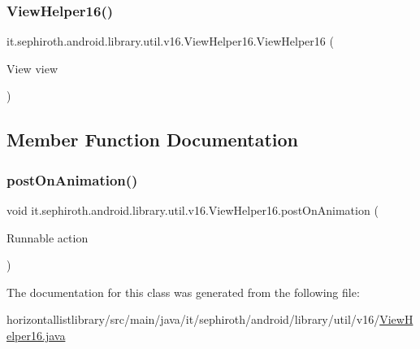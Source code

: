 \subsubsection{\texorpdfstring{View\+Helper16()}{ViewHelper16()}}
{\footnotesize\ttfamily it.\+sephiroth.\+android.\+library.\+util.\+v16.\+View\+Helper16.\+View\+Helper16 (\begin{DoxyParamCaption}\item[{View}]{view }\end{DoxyParamCaption})}



\subsection{Member Function Documentation}
\mbox{\label{classit_1_1sephiroth_1_1android_1_1library_1_1util_1_1v16_1_1_view_helper16_a557cbede1bd2fcb39f1fe329d4b3b243}} 
\subsubsection{\texorpdfstring{post\+On\+Animation()}{postOnAnimation()}}
{\footnotesize\ttfamily void it.\+sephiroth.\+android.\+library.\+util.\+v16.\+View\+Helper16.\+post\+On\+Animation (\begin{DoxyParamCaption}\item[{Runnable}]{action }\end{DoxyParamCaption})}



The documentation for this class was generated from the following file\+:\begin{DoxyCompactItemize}
\item 
horizontallistlibrary/src/main/java/it/sephiroth/android/library/util/v16/\hyperlink{_view_helper16_8java}{View\+Helper16.\+java}\end{DoxyCompactItemize}
